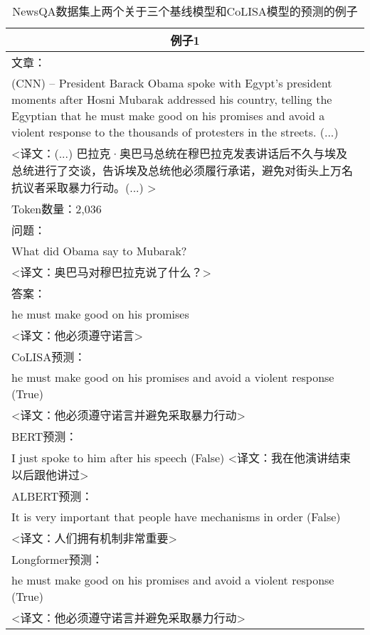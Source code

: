 \begin{table}[htbp]\scriptsize
    \centering
    \caption{NewsQA数据集上两个关于三个基线模型和CoLISA模型的预测的例子}
    \begin{tabular}{p{408pt}}
        \hline
        \multicolumn{1}{c}{\bfseries 例子1} \\
        \hline
        文章：\\
        (CNN) -- President Barack Obama spoke with Egypt's president moments after Hosni Mubarak addressed his country, telling the Egyptian that \textcolor[rgb]{1,0,0.2}{he must make good on his promises} and avoid a violent response to the thousands of protesters in the streets. (...) \\
        <译文：(...) 巴拉克·奥巴马总统在穆巴拉克发表讲话后不久与埃及总统进行了交谈，告诉埃及总统他必须履行承诺，避免对街头上万名抗议者采取暴力行动。(...) > \\
        \hline
        Token数量：2,036 \\
        \hline
        问题：\\
        What did Obama say to Mubarak? \\
        <译文：奥巴马对穆巴拉克说了什么？> \\
        \hline
        答案：\\
        he must make good on his promises \\
        <译文：他必须遵守诺言> \\
        \hline
        CoLISA预测：\\
        \textcolor[rgb]{1,0,0.2}{he must make good on his promises and avoid a violent response} (True) \\
        <译文：他必须遵守诺言并避免采取暴力行动> \\
        \hline
        BERT预测：\\
        I just spoke to him after his speech (False)
        <译文：我在他演讲结束以后跟他讲过> \\
        \hline
        ALBERT预测：\\
        It is very important that people have mechanisms in order (False) \\
        <译文：人们拥有机制非常重要> \\
        \hline
        Longformer预测：\\
        he must make good on his promises and avoid a violent response (True) \\
        <译文：他必须遵守诺言并避免采取暴力行动> \\
        \hline

\end{tabular}
\end{table}
